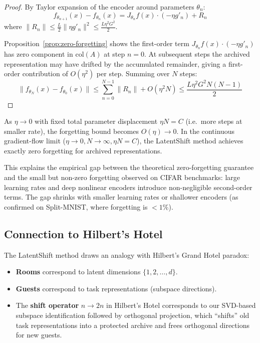 \begin{proof}
By Taylor expansion of the encoder around parameters $\theta_n$:
\[
    f_{\theta_{n+1}}(x) - f_{\theta_n}(x)
    = J_{\theta_n} f(x) \cdot (-\eta g'_n) + R_n
\]
where $\|R_n\| \leq \frac{L}{2} \|\eta g'_n\|^2 \leq \frac{L\eta^2 G^2}{2}$.

Proposition~\ref{prop:zero-forgetting} shows the first-order term
$J_{\theta_n} f(x) \cdot (-\eta g'_n)$ has zero component in
$\mathrm{col}(A)$ at step $n=0$. At subsequent steps the archived
representation may have drifted by the accumulated remainder, giving
a first-order contribution of $O(\eta^2)$ per step. Summing over $N$
steps:
\[
    \|f_{\theta_N}(x) - f_{\theta_0}(x)\|
    \leq \sum_{n=0}^{N-1} \|R_n\| + O(\eta^2 N)
    \leq \frac{L \eta^2 G^2 N(N-1)}{2}
\]
\end{proof}

\begin{corollary}
\label{cor:small-lr}
As $\eta \to 0$ with fixed total parameter displacement $\eta N = C$
(i.e.\ more steps at smaller rate), the forgetting bound becomes
$O(\eta) \to 0$. In the continuous gradient-flow limit ($\eta \to 0,
N \to \infty, \eta N = C$), the LatentShift method achieves exactly
zero forgetting for archived representations.
\end{corollary}

This explains the empirical gap between the theoretical zero-forgetting
guarantee and the small but non-zero forgetting observed on CIFAR benchmarks:
large learning rates and deep nonlinear encoders introduce non-negligible
second-order terms. The gap shrinks with smaller learning rates or
shallower encoders (as confirmed on Split-MNIST, where forgetting is
$< 1\%$).

\subsection{Connection to Hilbert's Hotel}

The LatentShift method draws an analogy with Hilbert's Grand Hotel paradox:

\begin{itemize}
    \item \textbf{Rooms} correspond to latent dimensions $\{1, 2, \ldots, d\}$.
    \item \textbf{Guests} correspond to task representations (subspace directions).
    \item The \textbf{shift operator} $n \to 2n$ in Hilbert's Hotel corresponds to
          our SVD-based subspace identification followed by orthogonal projection,
          which ``shifts'' old task representations into a protected archive and
          frees orthogonal directions for new guests.
\end{itemize}

